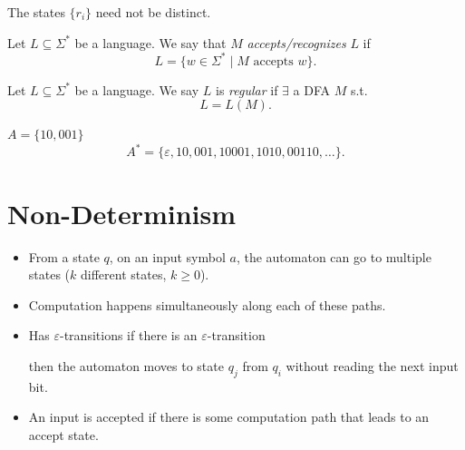 \begin{greybox}
\begin{remark}
The states $\{r_i\}$ need not be distinct.
\end{remark}
\end{greybox}

Let $L \subseteq \Sigma^*$ be a language. We say that $M$ \emph{accepts/recognizes} $L$ if
\[
L = \{ w \in \Sigma^* \mid M \text{ accepts } w \}.
\]

Let $L \subseteq \Sigma^*$ be a language. We say $L$ is \emph{regular} if $\exists$ a DFA $M$ s.t.
\[
L = L(M).
\]

\begin{example}
$A = \{10, 001\}$
\[
A^* = \{ \varepsilon, 10, 001, 10001, 1010, 00110, \dots \}.
\]
\end{example}

\section{Non-Determinism}

\begin{itemize}
    \item From a state $q$, on an input symbol $a$, the automaton can go to multiple states ($k$ different states, $k \geq 0$).
    \item Computation happens simultaneously along each of these paths.
    \item Has $\varepsilon$-transitions if there is an $\varepsilon$-transition
    \begin{center}
    \end{center}
    then the automaton moves to state $q_j$ from $q_i$ without reading the next input bit.
    \item An input is accepted if there is some computation path that leads to an accept state.
\end{itemize}

